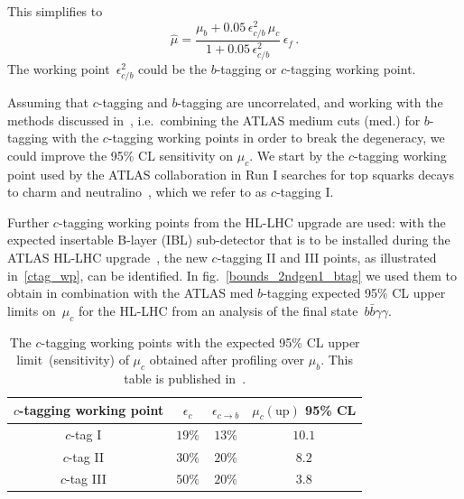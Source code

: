 This simplifies to
\begin{equation}
	\hat \mu  = \frac{\mu_b+0.05\,\epsilon_{c/b}^2\,\mu_c}{1+0.05\,\epsilon_{c/b}^2}\, \epsilon_f\,.
\end{equation}
The working point~$\epsilon_{c/b}^2$ could be the $b$-tagging or $c$-tagging working point.
\par Assuming that $c$-tagging and $b$-tagging are uncorrelated, and working with the methods discussed in~\cite{Perez:2015aoa,Perez:2015lra}, i.e.~combining the ATLAS medium cuts (med.) for $b$-tagging with the $c$-tagging working points in order to break the degeneracy, we could improve the 95\% CL sensitivity on $\mu_c$.
We start by the $c$-tagging working point used by the ATLAS collaboration in Run I searches for top squarks decays to charm and neutralino~\cite{Aad:2015gna,ATLAS-CONF-2013-063}, which we refer to as $c$-tagging I.
\par Further $c$-tagging working points from the HL-LHC upgrade are used: with the expected insertable B-layer (IBL) sub-detector that is to be installed during the ATLAS HL-LHC upgrade~\cite{Capeans:1291633,ATL-PHYS-PUB-2015-018}, the new $c$-tagging II and III points, as illustrated in~\autoref{ctag_wp},
can be identified. In fig.~\ref{bounds_2ndgen1_btag}  we used them to obtain in combination with the ATLAS med $b$-tagging expected 95\% CL upper limits on~$\mu_c$ for the HL-LHC from an analysis of the final state~$b\bar{b}\gamma\gamma$.
\begin{table}
	\centering
	\begin{tabular}{cccc}
		\toprule
		$c$-tagging working point	&$\epsilon_{c}$	& $\epsilon_{c \to b}$ & $\mu_c(\mathrm{up})$ 95\% CL  \\
		\midrule
		$c$-tag I ~\cite{Aad:2015gna,ATLAS-CONF-2013-063}
		& $19\%$ & $13 \%$ & $ 10.1$\\
		$c$-tag II ~\cite{Capeans:1291633,ATL-PHYS-PUB-2015-018}
		& $30\%$ & $20 \%$ & $ 8.2$\\
		$c$-tag III ~\cite{Capeans:1291633,ATL-PHYS-PUB-2015-018}
		& $50\%$ & $20 \%$ & $ 3.8$\\
		\bottomrule
	\end{tabular}
	\caption{The $c$-tagging working points with the expected 95\% CL upper limit~(sensitivity) of $\mu_c$ obtained after profiling over $\mu_b$. This table is published in~\cite{Alasfar:2019pmn}. }
	\label{ctag_wp}
\end{table}
%
%
